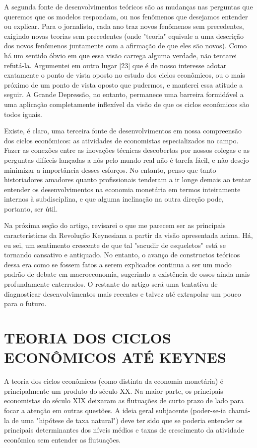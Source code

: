 \documentclass[12pt]{article}
\begin{document}
A segunda fonte de desenvolvimentos teóricos são as mudanças nas perguntas que queremos que os modelos respondam, ou nos fenômenos que desejamos entender ou explicar. Para o jornalista, cada ano traz novos fenômenos sem precedentes, exigindo novas teorias sem precedentes (onde "teoria" equivale a uma descrição dos novos fenômenos juntamente com a afirmação de que eles são novos). Como há um sentido óbvio em que essa visão carrega alguma verdade, não tentarei refutá-la. Argumentei em outro lugar [23] que é de nosso interesse adotar exatamente o ponto de vista oposto no estudo dos ciclos econômicos, ou o mais próximo de um ponto de vista oposto que pudermos, e manterei essa atitude a seguir. A Grande Depressão, no entanto, permanece uma barreira formidável a uma aplicação completamente inflexível da visão de que os ciclos econômicos são todos iguais.

Existe, é claro, uma terceira fonte de desenvolvimentos em nossa compreensão dos ciclos econômicos: as atividades de economistas especializados no campo. Fazer as conexões entre as inovações técnicas descobertas por nossos colegas e as perguntas difíceis lançadas a nós pelo mundo real não é tarefa fácil, e não desejo minimizar a importância desses esforços. No entanto, penso que tanto historiadores amadores quanto profissionais tenderam a ir longe demais ao tentar entender os desenvolvimentos na economia monetária em termos inteiramente internos à subdisciplina, e que alguma inclinação na outra direção pode, portanto, ser útil.

Na próxima seção do artigo, revisarei o que me parecem ser as principais características da Revolução Keynesiana a partir da visão apresentada acima. Há, eu sei, um sentimento crescente de que tal "sacudir de esqueletos" está se tornando cansativo e antiquado. No entanto, o avanço de constructos teóricos dessa era como se fossem fatos a serem explicados continua a ser um modo padrão de debate em macroeconomia, sugerindo a existência de ossos ainda mais profundamente enterrados. O restante do artigo será uma tentativa de diagnosticar desenvolvimentos mais recentes e talvez até extrapolar um pouco para o futuro.

\section{TEORIA DOS CICLOS ECONÔMICOS ATÉ KEYNES}

A teoria dos ciclos econômicos (como distinta da economia monetária) é principalmente um produto do século XX. Na maior parte, os principais economistas do século XIX deixaram as flutuações de curto prazo de lado para focar a atenção em outras questões. A ideia geral subjacente (poder-se-ia chamá-la de uma "hipótese de taxa natural") deve ter sido que se poderia entender os principais determinantes dos níveis médios e taxas de crescimento da atividade econômica sem entender as flutuações.
\end{document}
